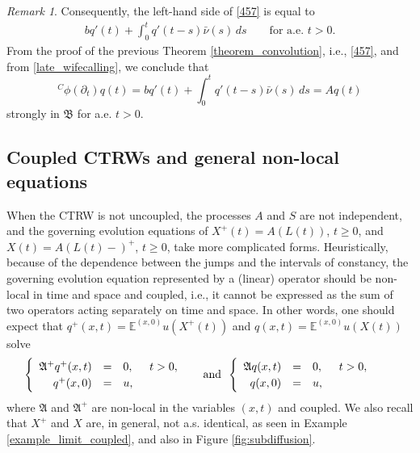 \documentclass[reqno]{amsart}
\theoremstyle{remark}
\newtheorem{remark}[theorem]{Remark}
\numberwithin{equation}{section} %
\newcommand{\1}{\mathds{1}}
\begin{document}
\begin{remark}
		Consequently, the left-hand side of \eqref{457} is equal to
		\begin{align}
			bq'(t) + \int_0^t q'(t-s)\bar{\nu}(s)\,ds
			\qquad\text{for a.e. }t>0.
			\label{late_wifecalling}
		\end{align}
		From the proof of the previous Theorem \ref{theorem_convolution}, i.e., \eqref{457}, and from \eqref{late_wifecalling}, we conclude that
		\begin{equation}
			{}^C\phi(\partial_t)q(t)
			=
			bq'(t)
			+
			\int_0^t q'(t-s)\bar{\nu}(s)\,ds
			=
			Aq(t)
		\end{equation}
		strongly in $\mathfrak B$ for a.e. $t>0$.
		
		
		
		
	\end{remark}
	
	
	
	\subsection{Coupled CTRWs and general non-local equations}
	\label{sec_coupled_harmonic}
	When the CTRW is not uncoupled, the processes $A$ and $S$ are not independent, and the governing evolution equations of $X^+(t)=A(L(t))$, $t\ge0$, and $X(t)=A(L(t)-)^+$, $t\ge0$, take more complicated forms. Heuristically, because of the dependence between the jumps and the intervals of constancy, the governing evolution equation represented by a (linear) operator should be non-local in time and space and coupled, i.e., it cannot be expressed as the sum of two operators acting separately on time and space. In other words, one should expect that $q^+(x,t) = \mathds{E}^{(x,0)}u(X^+(t))$ and $q(x,t) = \mathds{E}^{(x,0)} u(X(t))$ solve
	\begin{align}\label{evolutions}
		&\begin{cases}
			\begin{array}{rcll}
				\mathfrak{A}^+q^+(x,t) &=& 0, \enskip &t>0,\\
				q^+(x,0) &=& u,\enskip&
			\end{array}
		\end{cases}\enskip\text{and}\enskip
		\begin{cases}
			\begin{array}{rcll}
				\mathfrak{A}q(x,t) &=& 0, \enskip &t>0,\\
				q(x,0) &=& u,\enskip&
			\end{array}
		\end{cases}
	\end{align}
	where $\mathfrak{A}$ and $\mathfrak{A}^+$ are non-local in the variables $(x,t)$ and coupled. We also recall that $X^+$ and $X$ are, in general, not a.s. identical, as seen in Example \ref{example_limit_coupled}, and also in Figure \ref{fig:subdiffusion}.
	
\end{document}

